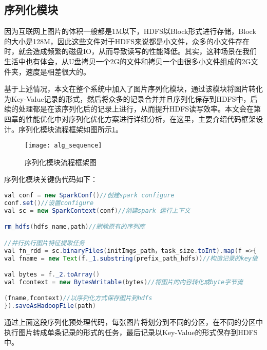 \subsection{序列化模块}
因为互联网上图片的体积一般都是1M以下，HDFS以Block形式进行存储，Block的大小是128M，因此这些文件对于HDFS来说都是小文件，众多的小文件存在时，就会造成频繁的磁盘IO，从而导致读写的性能降低。其实，这种场景在我们生活中也有体会，从U盘拷贝一个2G的文件和拷贝一个由很多小文件组成的2G文件夹，速度是相差很大的。

基于上述情况，本文在整个系统中加入了图片序列化模块，通过该模块将图片转化为Key-Value记录的形式，然后将众多的记录合并并且序列化保存到HDFS中，后续的处理都是在该序列化后的记录上进行，从而提升HDFS读写效率。本文会在第四章的性能优化中对序列化优化方案进行详细分析，在这里，主要介绍代码框架设计。序列化模块流程框架如图所示\ref{fig:alg_sequence}。
\begin{figure}[htp]
\centering
\texttt{[image: alg\_sequence]}
\caption{序列化模块流程框架图}
\label{fig:alg_sequence}
\end{figure}

序列化模块关键伪代码如下：
\begin{lstlisting}[language=Java]
val conf = new SparkConf()//创建spark configure
conf.set()//设置configure
val sc = new SparkContext(conf)//创建spark 运行上下文

rm_hdfs(hdfs_name,path)//删除原有的序列库

//并行执行图片特征提取任务
val fn_rdd = sc.binaryFiles(initImgs_path，task_size.toInt).map(f =>{
val fname = new Text(f._1.substring(prefix_path_hdfs))//构造记录的key值

val bytes = f._2.toArray()
val fcontext = new BytesWritable(bytes)//将图片的内容转化成byte字节流

(fname,fcontext)//以序列化方式保存图片到hdfs
}).saveAsHadoopFile(path)
\end{lstlisting}

通过上面这段序列化预处理代码，每张图片将划分到不同的分区，在不同的分区中执行图片转成单条记录的形式的任务，最后记录以Key-Value的形式保存到HDFS中。
